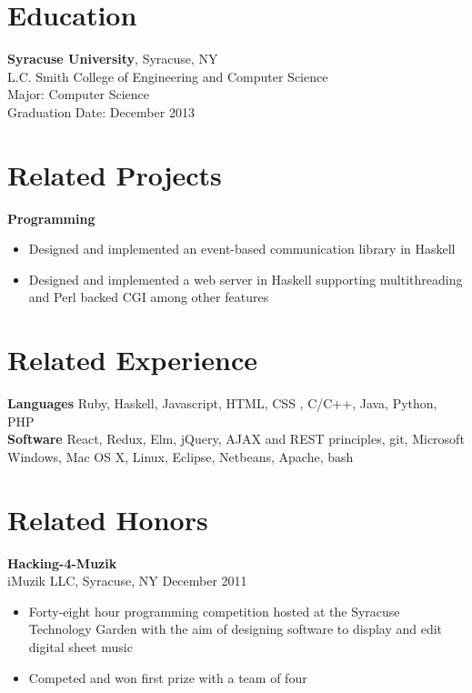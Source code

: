 \documentclass[margin]{res}
\begin{document}
 
 
 
\address{{\bf Address} \\ 28 Sand Pond Road \\ Warwick, RI 02888 \\ danielwilsonthomas@gmail.com}
 
\begin{resume} 
 
\section{Education} 
{\bf Syracuse University}, Syracuse, NY \\
L.C. Smith College of Engineering and Computer Science \\
Major: Computer Science \\
Graduation Date: December 2013

\section{Related Projects}
{\bf Programming} 
\begin{itemize} %
\item Designed and implemented an event-based communication library in Haskell
\item Designed and implemented a web server in Haskell supporting multithreading and Perl backed CGI among other features
\end{itemize}

\section{Related Experience}
 {\bf Languages} Ruby, Haskell, Javascript, HTML, CSS , C/C++, Java, Python, PHP \\
 {\bf Software} React, Redux, Elm, jQuery, AJAX and REST principles, git, Microsoft Windows, Mac OS X, Linux, Eclipse, Netbeans, Apache, bash

\section{Related Honors}
{\bf Hacking-4-Muzik}\\iMuzik LLC, Syracuse, NY \hfill December 2011
\begin{itemize}
\item Forty-eight hour programming competition hosted at the Syracuse Technology Garden with the aim of designing software to display and edit digital sheet music
\item Competed and won first prize with a team of four
\end{itemize}


\end{resume}
\end{document}
